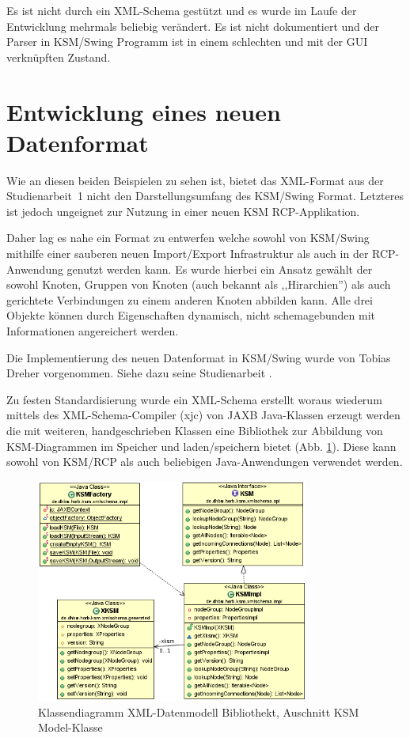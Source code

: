 \documentclass[%
12pt,titlepage,abstracton]{scrreprt}
\begin{document}
Es ist nicht durch ein XML-Schema gestützt und es wurde im Laufe der Entwicklung
mehrmals beliebig verändert. Es ist nicht dokumentiert und der Parser in
KSM/Swing Programm ist in einem schlechten und mit der GUI verknüpften Zustand.


\section{Entwicklung eines neuen Datenformat}
Wie an diesen beiden Beispielen zu sehen ist, bietet das XML-Format aus der
Studienarbeit~1 nicht den Darstellungsumfang des KSM/Swing Format. Letzteres ist
jedoch ungeignet zur Nutzung in einer neuen KSM RCP-Applikation.

Daher lag es nahe ein Format zu entwerfen welche sowohl von KSM/Swing mithilfe
einer sauberen neuen Import/Export Infrastruktur als auch in der RCP-Anwendung
genutzt werden kann. Es wurde hierbei ein Ansatz gewählt der sowohl Knoten,
Gruppen von Knoten (auch bekannt als ,,Hirarchien'') als auch gerichtete
Verbindungen zu einem anderen Knoten abbilden kann. Alle drei Objekte können
durch Eigenschaften dynamisch, nicht schemagebunden mit Informationen
angereichert werden.

\par
\begingroup
\leftskip=1.5cm %
\noindent Die Implementierung des neuen Datenformat in KSM/Swing wurde von
Tobias Dreher vorgenommen. Siehe dazu seine Studienarbeit \cite{dreher11}.
\par
\endgroup


Zu festen Standardisierung wurde ein XML-Schema erstellt woraus wiederum mittels
des XML-Schema-Compiler (xjc) von JAXB Java-Klassen erzeugt werden die mit
weiteren, handgeschrieben Klassen eine Bibliothek zur Abbildung von
KSM-Diagrammen im Speicher und laden/speichern bietet (Abb.
\ref{fig:class-diagram-xmlschema}). Diese kann sowohl von KSM/RCP als auch
beliebigen Java-Anwendungen verwendet werden.

\begin{figure}[ht!]
  \centering
\includegraphics[width=0.8\textwidth]{images/class-diagram-xmlschema.PNG}
\caption{Klassendiagramm XML-Datenmodell Bibliothekt, Auschnitt KSM
Model-Klasse}
\label{fig:class-diagram-xmlschema}
\end{figure}
\end{document}
